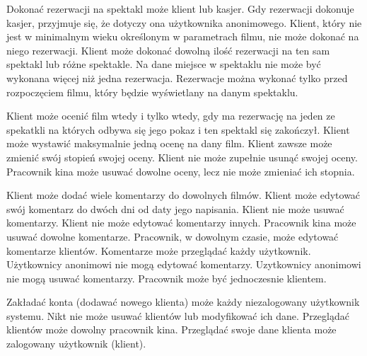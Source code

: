 \regula Dokonać rezerwacji na spektakl może klient lub kasjer. Gdy rezerwacji dokonuje kasjer, przyjmuje się, że dotyczy ona użytkownika anonimowego.
\regula Klient, który nie jest w minimalnym wieku określonym w parametrach filmu, nie może dokonać na niego rezerwacji.
\regula Klient może dokonać dowolną ilość rezerwacji na ten sam spektakl lub różne spektakle.
\regula Na dane miejsce w spektaklu nie może być wykonana więcej niż jedna rezerwacja.
\regula Rezerwacje można wykonać tylko przed rozpoczęciem filmu, który będzie wyświetlany na danym spektaklu.

\regula Klient może ocenić film wtedy i tylko wtedy, gdy ma rezerwację na jeden ze spekatkli na których odbywa się jego pokaz i ten spektakl się zakończył.
\regula Klient może wystawić maksymalnie jedną ocenę na dany film.
\regula Klient zawsze może zmienić swój stopień swojej oceny.
\regula Klient nie może zupełnie usunąć swojej oceny.
\regula Pracownik kina może usuwać dowolne oceny, lecz nie może zmieniać ich stopnia.

\regula Klient może dodać wiele komentarzy do dowolnych filmów.
\regula Klient może edytować swój komentarz do dwóch dni od daty jego napisania.
\regula Klient nie może usuwać komentarzy.
\regula Klient nie może edytować komentarzy innych.
\regula Pracownik kina może usuwać dowolne komentarze.
\regula Pracownik, w dowolnym czasie, może edytować komentarze klientów.
\regula Komentarze może przeglądać każdy użytkownik.
\regula Użytkownicy anonimowi nie mogą edytować komentarzy.
\regula Uzytkownicy anonimowi nie mogą usuwać komentarzy.
\regula Pracownik może być jednoczesnie klientem.

\regula Zakładać konta (dodawać nowego klienta) może każdy niezalogowany użytkownik systemu.
\regula Nikt nie może usuwać klientów lub modyfikować ich dane.
\regula Przeglądać klientów może dowolny pracownik kina.
\regula Przeglądać swoje dane klienta może zalogowany użytkownik (klient).
